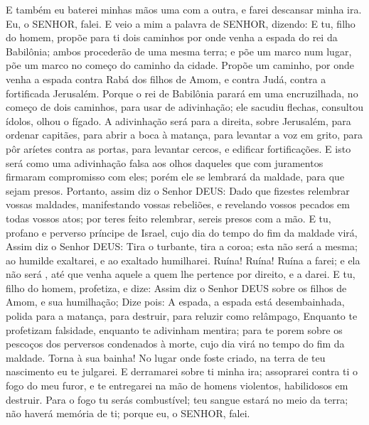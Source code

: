 {  E também eu baterei minhas mãos uma com a outra, e farei descansar minha ira. Eu, o SENHOR, falei.
  E veio a mim a palavra de SENHOR, dizendo:
  E tu, filho do homem, propõe para ti dois caminhos por onde venha a espada do rei da Babilônia; ambos procederão de uma mesma terra; e põe um marco num lugar, põe um marco no começo do caminho da cidade.
  Propõe um caminho, por onde venha a espada contra Rabá dos filhos de Amom, e contra Judá, contra a fortificada Jerusalém.
  Porque o rei de Babilônia parará em uma encruzilhada, no começo de dois caminhos, para usar de adivinhação; ele sacudiu flechas, consultou ídolos, olhou o fígado.
  A adivinhação será para a direita, sobre Jerusalém, para ordenar capitães, para abrir a boca à matança, para levantar a voz em grito, para pôr aríetes contra as portas, para levantar cercos, e edificar fortificações.
  E isto será como uma adivinhação falsa aos olhos daqueles que com juramentos firmaram compromisso com eles; porém ele se lembrará da maldade, para que sejam presos.
  Portanto, assim diz o Senhor DEUS: Dado que fizestes relembrar vossas maldades, manifestando vossas rebeliões, e revelando vossos pecados em todas vossos atos; por teres feito relembrar, sereis presos com a mão.
  E tu, profano e perverso príncipe de Israel, cujo dia do tempo do fim da maldade virá,
  Assim diz o Senhor DEUS: Tira o turbante, tira a coroa; esta não será a mesma; ao humilde exaltarei, e ao exaltado humilharei.
  Ruína! Ruína! Ruína a farei; e ela não será
{},  até que venha aquele a quem lhe pertence por direito, e
{} a darei.
  E tu, filho do homem, profetiza, e dize: Assim diz o Senhor DEUS sobre os filhos de Amom, e sua humilhação; Dize pois: A espada, a espada está desembainhada, polida para a matança, para destruir, para reluzir como relâmpago,
  Enquanto te profetizam falsidade, enquanto te adivinham mentira; para te porem sobre os pescoços dos perversos condenados à morte, cujo dia virá no tempo do fim da maldade.
  Torna
{} à sua bainha! No lugar onde foste criado, na terra de teu nascimento eu te julgarei.
  E derramarei sobre ti minha ira; assoprarei contra ti o fogo do meu furor, e te entregarei na mão de homens violentos,
 habilidosos em destruir.
  Para o fogo tu serás combustível; teu sangue estará no meio da terra; não haverá memória de ti; porque eu, o SENHOR, falei.
\par }

